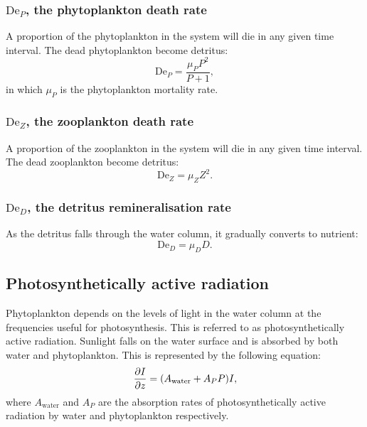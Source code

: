 \subsubsection{$\mathrm{De}_P$, the phytoplankton death rate}\label{sec:De_P}

A proportion of the phytoplankton in the system will die in any given time
interval. The dead phytoplankton become detritus:
\begin{equation}
  \mathrm{De}_P=\frac{\mu_P P^2}{P+1},
\end{equation}
in which $\mu_P$ is the phytoplankton mortality rate.

\subsubsection{$\mathrm{De}_Z$, the zooplankton death rate}\label{sec:De_Z}

A proportion of the zooplankton in the system will die in any given time
interval. The dead zooplankton become detritus:
\begin{equation}
  \mathrm{De}_Z=\mu_Z Z^2.
\end{equation}

\subsubsection{$\mathrm{De}_D$, the detritus remineralisation rate}\label{sec:De_D}

As the detritus falls through the water column, it gradually converts to
nutrient:
\begin{equation}
  \mathrm{De}_D=\mu_D D.
\end{equation}

\subsection{Photosynthetically active radiation}\label{sec:I}

Phytoplankton depends on the levels of light in the water column at the
frequencies useful for photosynthesis. This is referred to as
photosynthetically active radiation. Sunlight falls on the water surface and
is absorbed by both water and phytoplankton. This is represented by the
following equation:
\begin{equation}
  \ppx[z]{I}=(A_{\mathrm{water}}+A_PP)I,
\end{equation}
where $A_{\mathrm{water}}$ and $A_P$ are the absorption rates of
photosynthetically active radiation by water and phytoplankton respectively.

